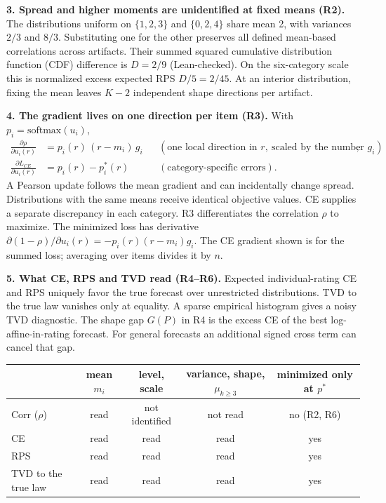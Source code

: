 \documentclass[11pt]{article}
\begin{document}
\textbf{3. Spread and higher moments are unidentified at fixed means (R2).} The distributions uniform on $\{1,2,3\}$ and $\{0,2,4\}$ share mean 2, with variances $2/3$ and $8/3$. Substituting one for the other preserves all defined mean-based correlations across artifacts. Their summed squared cumulative distribution function (CDF) difference is $D=2/9$ (Lean-checked). On the six-category scale this is normalized excess expected RPS $D/5=2/45$. At an interior distribution, fixing the mean leaves $K-2$ independent shape directions per artifact.

\textbf{4. The gradient lives on one direction per item (R3).} With $p_i=\mathrm{softmax}(u_i)$,
\[
\begin{aligned}
\frac{\partial\rho}{\partial u_i(r)}&=p_i(r)\,(r-m_i)\,g_i &&(\text{one local direction in }r,\ \text{scaled by the number }g_i),\\
\frac{\partial L_{CE}}{\partial u_i(r)}&=p_i(r)-p^\ast_i(r) &&(\text{category-specific errors}).
\end{aligned}
\]
A Pearson update follows the mean gradient and can incidentally change spread. Distributions with the same means receive identical objective values. CE supplies a separate discrepancy in each category. R3 differentiates the correlation $\rho$ to maximize. The minimized loss has derivative $\partial(1-\rho)/\partial u_i(r)=-p_i(r)(r-m_i)g_i$. The CE gradient shown is for the summed loss; averaging over items divides it by $n$.

\textbf{5. What CE, RPS and TVD read (R4–R6).} Expected individual-rating CE and RPS uniquely favor the true forecast over unrestricted distributions. TVD to the true law vanishes only at equality. A sparse empirical histogram gives a noisy TVD diagnostic. The shape gap $G(P)$ in R4 is the excess CE of the best log-affine-in-rating forecast. For general forecasts an additional signed cross term can cancel that gap.

\begin{center}
\renewcommand{\arraystretch}{1.25}
\begin{tabular}{@{}lcccc@{}}
\toprule
 & mean $m_i$ & level, scale & variance, shape, $\mu_{k\ge3}$ & minimized only at $p^\ast$\\
\midrule
Corr ($\rho$) & read & not identified & not read & no (R2, R6)\\
CE & read & read & read & yes\\
RPS & read & read & read & yes\\
TVD to the true law & read & read & read & yes\\
\bottomrule
\end{tabular}
\end{center}
\end{document}
